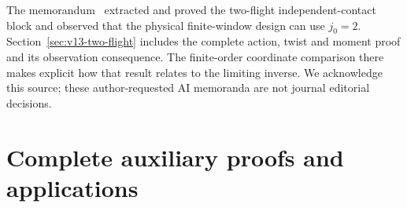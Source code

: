 The memorandum~\cite{A2ReviewV12} extracted and proved the two-flight
independent-contact block and observed that the physical finite-window
design can use $j_0=2$. Section~\ref{sec:v13-two-flight} includes the
complete action, twist and moment proof and its observation consequence.
The finite-order coordinate comparison there makes explicit how that
result relates to the limiting inverse. We acknowledge this source;
these author-requested AI memoranda are not journal editorial decisions.

\appendix
\renewcommand{\thesection}{A.\arabic{section}}
\renewcommand{\theHsection}{appendix.\arabic{section}}
\part{Complete auxiliary proofs and applications}






































